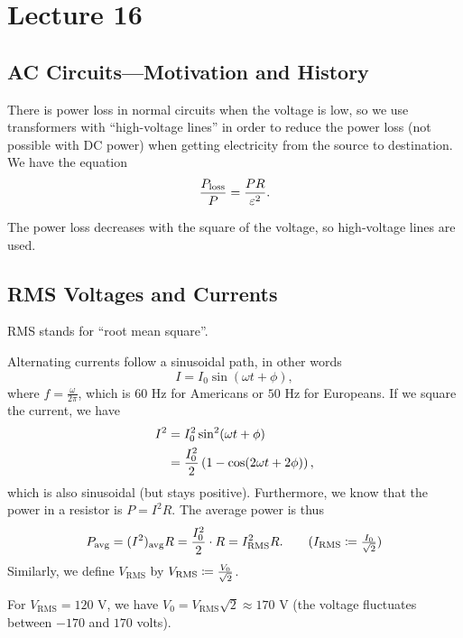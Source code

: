 \documentclass[class=article, crop=false]{standalone}
\begin{document}
  \section{Lecture 16}
  \subsection{AC Circuits---Motivation and History}
  There is power loss in normal circuits when the voltage is low, so we use transformers with ``high-voltage lines'' in order to reduce the power loss (not possible with DC power) when getting electricity from the source to destination. We have the equation
  \[
    \frac{P_\text{loss}}{P} = \frac{PR}{\varepsilon^2}.
  \]
  \begin{note}{}
    The power loss decreases with the square of the voltage, so high-voltage lines are used.
  \end{note}
  \subsection{RMS Voltages and Currents}
  \begin{note}{}
    RMS stands for ``root mean square''.
  \end{note}
  Alternating currents follow a sinusoidal path, in other words
  \[
    I = I_0\sin (\omega t+\phi),
  \]
  where $f = \frac{\omega}{2\pi}$, which is $60$ Hz for Americans or $50$ Hz for Europeans. If we square the current, we have
  \begin{align*}
    I^2 &= I_0^2\sin^2(\omega t + \phi) \\
        &= \frac{I_0^2}{2}\left( 1 - \cos(2\omega t + 2\phi) \right),
  \end{align*}
  which is also sinusoidal (but stays positive). Furthermore, we know that the power in a resistor is $P = I^2R$. The average power is thus
  \[
    P_\text{avg} = (I^2)_\text{avg}R = \frac{I_0^2}{2}\cdot R = I_\text{RMS}^2R. \tag{$I_\text{RMS} \ceq \frac{I_0}{\sqrt{2}}$}
  \]
  Similarly, we define $V_\text{RMS}$ by $V_\text{RMS} \coloneqq \frac{V_0}{\sqrt{2}}$. \par
  For $V_\text{RMS} = 120$ V, we have $V_0 = V_\text{RMS}\sqrt{2}\approx 170$ V (the voltage fluctuates between $-170$ and $170$ volts).
\end{document}
